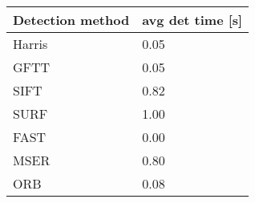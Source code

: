 \begin{tabular}{ l l }
	Detection method & avg det time [s] \\
	\hline
	 Harris & 0.05 \\
	 GFTT & 0.05 \\
	 SIFT & 0.82 \\
	 SURF & 1.00 \\
	 FAST & 0.00 \\
	 MSER & 0.80 \\
	 ORB & 0.08
\end{tabular}